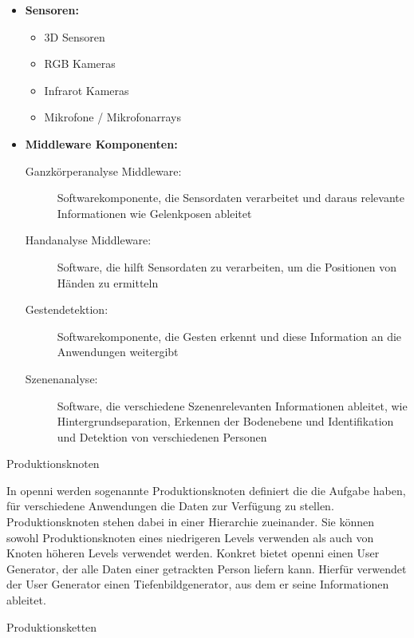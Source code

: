\begin{itemize}
\item \textbf{Sensoren:}
\begin{itemize}
  \item 3D Sensoren
  \item RGB Kameras
  \item Infrarot Kameras
  \item Mikrofone / Mikrofonarrays
\end{itemize}
\item \textbf{Middleware Komponenten:}
\begin{description}
  \item[Ganzkörperanalyse Middleware:] Softwarekomponente, die Sensordaten
  verarbeitet und daraus relevante Informationen wie Gelenkposen ableitet
  \item[Handanalyse Middleware:] Software, die hilft Sensordaten zu verarbeiten,
  um die Positionen von Händen zu ermitteln
  \item[Gestendetektion:] Softwarekomponente, die Gesten erkennt und diese
  Information an die Anwendungen weitergibt
  \item[Szenenanalyse:] Software, die verschiedene Szenenrelevanten
  Informationen ableitet, wie Hintergrundseparation, Erkennen der Bodenebene und Identifikation und Detektion von verschiedenen Personen
\end{description}
\end{itemize}


\begin{description}
\item[Produktionsknoten]
\end{description}


In \gls{openni} werden sogenannte Produktionsknoten definiert die die Aufgabe haben,
 für verschiedene Anwendungen die Daten zur Verfügung zu stellen.
 Produktionsknoten stehen dabei in einer Hierarchie zueinander.
 Sie können sowohl Produktionsknoten eines niedrigeren Levels verwenden als auch von Knoten höheren
 Levels verwendet werden. Konkret bietet \gls{openni} einen User Generator, der alle Daten einer getrackten Person
 liefern kann. Hierfür verwendet der User Generator einen Tiefenbildgenerator, aus dem er seine Informationen ableitet.

\begin{description}
\item[Produktionsketten]
\end{description}

